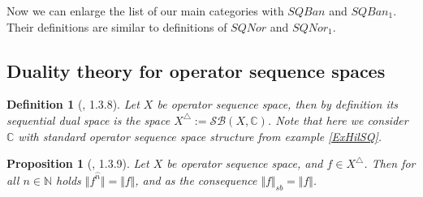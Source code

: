 \documentclass[12pt]{article}
\newtheorem{proposition}[theorem]{Proposition}
\newtheorem{definition}[theorem]{Definition}
\begin{document}
Now we can enlarge the list of our main categories with $SQBan$ and $SQBan_1$. Their definitions are similar to definitions of $SQNor$ and $SQNor_1$.










































\subsection{Duality theory for operator sequence spaces}

\begin{definition}[\cite{LamOpFolgen}, 1.3.8]\label{DeffSQDual} 
Let $X$ be operator sequence space, then by definition its sequential dual space is the space $X^\triangle := \mathcal{SB}(X, \mathbb{C})$. Note that here we consider $\mathbb{C}$ with standard operator sequence space structure from example \ref{ExHilSQ}. 
\end{definition}

\begin{proposition}[\cite{LamOpFolgen}, 1.3.9]\label{PrEveryLinFuncIsSQBounded}
Let $X$ be operator sequence space, and $f\in X^\triangle$. Then for all $n\in\mathbb{N}$ holds $\Vert f^{\wideparen{n}}\Vert=\Vert f\Vert$, and as the consequence $\Vert f\Vert_{sb}=\Vert f\Vert$.
\end{proposition}
\end{document}
